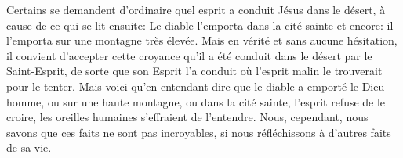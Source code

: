 Certains se demandent d’ordinaire quel esprit a conduit Jésus dans le désert,
	à cause de ce qui se lit ensuite:
		Le diable l’emporta dans la cité sainte
	et encore:
		il l’emporta sur une montagne très élevée.
Mais en vérité et sans aucune hésitation, il convient d’accepter cette croyance
	qu’il a été conduit dans le désert par le Saint-Esprit,
	de sorte que son Esprit l’a conduit
		où l’esprit malin le trouverait pour le tenter.
Mais voici qu’en entendant dire que le diable a emporté le Dieu-homme,
	ou sur une haute montagne, ou dans la cité sainte,
	l’esprit refuse de le croire,
	les oreilles humaines s’effraient de l’entendre.
Nous, cependant, nous savons que ces faits ne sont pas incroyables,
	si nous réfléchissons à d’autres faits de sa vie.
